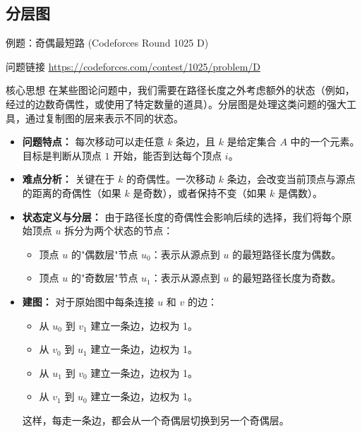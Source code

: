 \documentclass[11pt]{beamer}
\begin{document}
\subsection{分层图}
\begin{frame}{例题：奇偶最短路 (Codeforces Round 1025 D)}
    \begin{block}{问题链接}
        \url{https://codeforces.com/contest/1025/problem/D}
    \end{block}
    \begin{block}{核心思想}
        在某些图论问题中，我们需要在路径长度之外考虑额外的状态（例如，经过的边数奇偶性，或使用了特定数量的道具）。分层图是处理这类问题的强大工具，通过复制图的层来表示不同的状态。
    \end{block}
    \begin{itemize}
        \item \textbf{问题特点：} 每次移动可以走任意 $k$ 条边，且 $k$ 是给定集合 $A$ 中的一个元素。目标是判断从顶点 $1$ 开始，能否到达每个顶点 $i$。
        \item \textbf{难点分析：} 关键在于 $k$ 的奇偶性。一次移动 $k$ 条边，会改变当前顶点与源点的距离的奇偶性（如果 $k$ 是奇数），或者保持不变（如果 $k$ 是偶数）。
    \end{itemize}
\end{frame}

\begin{frame}
    \begin{itemize}
        \item \textbf{状态定义与分层：}
        由于路径长度的奇偶性会影响后续的选择，我们将每个原始顶点 $u$ 拆分为两个状态的节点：
        \begin{itemize}
            \item 顶点 $u$ 的"偶数层"节点 $u_0$：表示从源点到 $u$ 的最短路径长度为偶数。
            \item 顶点 $u$ 的"奇数层"节点 $u_1$：表示从源点到 $u$ 的最短路径长度为奇数。
        \end{itemize}
    \end{itemize}
\end{frame}

\begin{frame}
    \begin{itemize}
        \item \textbf{建图：}
        对于原始图中每条连接 $u$ 和 $v$ 的边：
        \begin{itemize}
            \item 从 $u_0$ 到 $v_1$ 建立一条边，边权为 1。
            \item 从 $v_0$ 到 $u_1$ 建立一条边，边权为 1。
            \item 从 $u_1$ 到 $v_0$ 建立一条边，边权为 1。
            \item 从 $v_1$ 到 $u_0$ 建立一条边，边权为 1。
        \end{itemize}
        这样，每走一条边，都会从一个奇偶层切换到另一个奇偶层。
    \end{itemize}
\end{frame}
\end{document}
